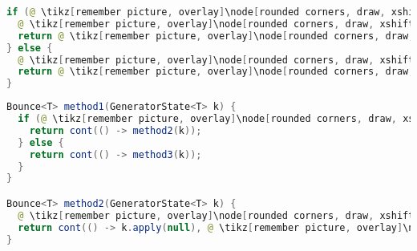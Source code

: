 \pagebreak

\begin{center}
\begin{mdframed}
\begin{minipage}[t]{0.4\textwidth}
\begin{lstlisting}[language=Java, numbers=none, breaklines=true]
if (@ \tikz[remember picture, overlay]\node[rounded corners, draw, xshift=-0.1cm, inner sep=5pt, anchor=west, yshift=0.1cm] {Feltétel}; \hspace*{1.04cm} \vspace*{0.3cm} @) {
  @ \tikz[remember picture, overlay]\node[rounded corners, draw, xshift=-0.1cm, inner sep=5pt, anchor=west] {Kódrészlet \#1}; \vspace*{0.5cm} @ 
  return @ \tikz[remember picture, overlay]\node[rounded corners, draw, xshift=-0.1cm, inner sep=5pt, anchor=west, yshift=0.1cm] {Kifejezés \#1}; \vspace*{0.3cm} @
} else {
  @ \tikz[remember picture, overlay]\node[rounded corners, draw, xshift=-0.1cm, inner sep=5pt, anchor=west] {Kódrészlet \#2}; \vspace*{0.5cm} @ 
  return @ \tikz[remember picture, overlay]\node[rounded corners, draw, xshift=-0.1cm, inner sep=5pt, anchor=west, yshift=0.1cm] {Kifejezés \#2}; \vspace*{0.3cm} @
}
\end{lstlisting}
\end{minipage} 
\begin{minipage}[t]{0.6\textwidth}
\begin{lstlisting}[language=Java, numbers=none, breaklines=true]
Bounce<T> method1(GeneratorState<T> k) {
  if (@ \tikz[remember picture, overlay]\node[rounded corners, draw, xshift=-0.1cm, inner sep=5pt, anchor=west, yshift=0.1cm] {Feltétel}; \hspace*{1.04cm} @) {
    return cont(() -> method2(k));
  } else {
    return cont(() -> method3(k));
  }
}

Bounce<T> method2(GeneratorState<T> k) {
  @ \tikz[remember picture, overlay]\node[rounded corners, draw, xshift=-0.1cm, inner sep=5pt, anchor=west] {Kódrészlet \#1}; \vspace*{0.3cm} @
  return cont(() -> k.apply(null), @ \tikz[remember picture, overlay]\node[rounded corners, draw, xshift=-0.1cm, inner sep=5pt, anchor=west, yshift=0.1cm] {Kifejezés \#1}; \vspace*{0.2cm} \hspace*{1.75cm} @);
}


\end{lstlisting}
\end{minipage}
\end{mdframed}
\end{center}
